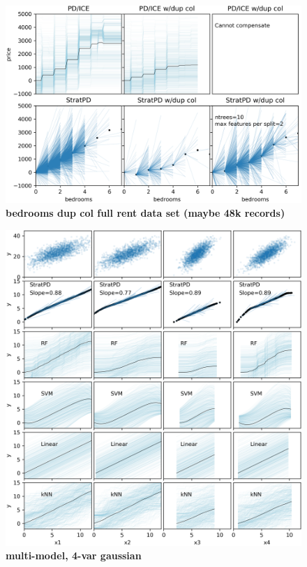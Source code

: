 \documentclass[12pt]{article}
\begin{document}
\begin{figure}[htbp]
\begin{center}
\includegraphics[scale=0.6]{images/bedrooms_vs_price_dup.png}
\caption{{\bf  bedrooms dup col full rent data set (maybe 48k records)}}
\label{fig:beds_dup}
\end{center}
\end{figure}

\begin{figure}[htbp]
\begin{center}
\includegraphics[scale=0.6]{images/multivar_multimodel_normal.png}
\caption{{\bf  multi-model, 4-var gaussian}}
\label{fig:4var}
\end{center}
\end{figure}
\end{document}
